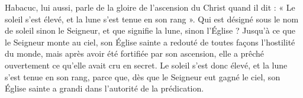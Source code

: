Habacuc, lui aussi, parle de la gloire de l’ascension du Christ quand il dit : « Le soleil s’est élevé, et la lune s’est tenue en son rang ». Qui est désigné sous le nom de soleil sinon le Seigneur, et que signifie la lune, sinon l’Église ? Jusqu’à ce que le Seigneur monte au ciel, son Église sainte a redouté de toutes façons l’hostilité du monde, mais après avoir été fortifiée par son ascension, elle a prêché ouvertement ce qu’elle avait cru en secret. Le soleil s’est donc élevé, et la lune s’est tenue en son rang, parce que, dès que le Seigneur eut gagné le ciel, son Église sainte a grandi dans l’autorité de la prédication.